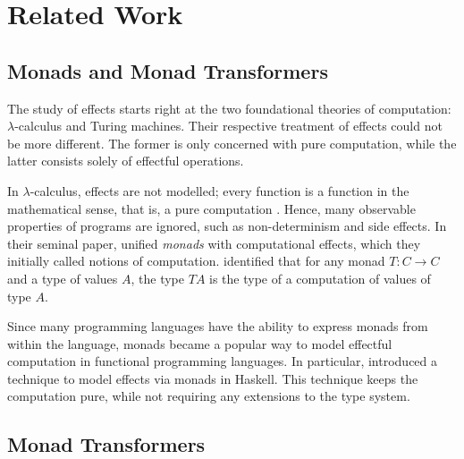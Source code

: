 \chapter{Related Work}\label{chap:related_work}


\section{Monads and Monad Transformers}

The study of effects starts right at the two foundational theories of computation: $\lambda$-calculus and Turing machines. Their respective treatment of effects could not be more different. The former is only concerned with pure computation, while the latter consists solely of effectful operations.

In $\lambda$-calculus, effects are not modelled; every function is a function in the mathematical sense, that is, a pure computation \autocite{moggi_computational_1989}. Hence, many observable properties of programs are ignored, such as non-determinism and side effects. In their seminal paper, \textcite{moggi_computational_1989} unified \emph{monads} with computational effects, which they initially called notions of computation. \citeauthor{moggi_computational_1989} identified that for any monad $T: C \to C$ and a type of values $A$, the type $T A$ is the type of a computation of values of type $A$.

Since many programming languages have the ability to express monads from within the language, monads became a popular way to model effectful computation in functional programming languages. In particular, \textcite{peyton_jones_imperative_1993} introduced a technique to model effects via monads in Haskell. This technique keeps the computation pure, while not requiring any extensions to the type system.

\section{Monad Transformers}

